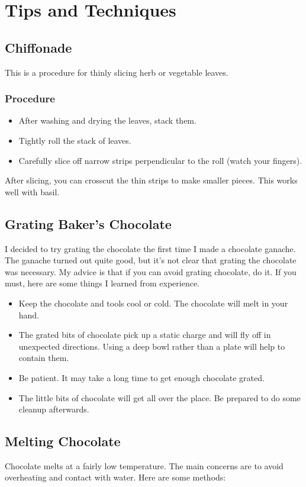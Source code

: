 \documentclass[10pt, openany]{book}
\begin{document}
\chapter{Tips and Techniques}

\section{Chiffonade}
\label{tip:Chiffonade}
This is a procedure for thinly slicing herb or vegetable leaves.
\subsection{Procedure}
\begin{itemize}
  \item After washing and drying the leaves, stack them.
  \item Tightly roll the stack of leaves.
  \item Carefully slice off narrow strips perpendicular to the roll (watch your fingers).
\end{itemize}
After slicing, you can crosscut the thin strips to make smaller pieces.  This works well with basil.

\section{Grating Baker's Chocolate}
\label{tip:GrateChocolate}
I decided to try grating the chocolate the first time I made a chocolate ganache.  The ganache turned out quite good, but it's not clear that grating the chocolate was necessary.  My advice is that if you can avoid grating chocolate, do it.  If you must, here are some things I learned from experience.
\begin{itemize}
  \item Keep the chocolate and tools cool or cold.  The chocolate will melt in your hand.
  \item The grated bits of chocolate pick up a static charge and will fly off in unexpected directions.  Using a deep bowl rather than a plate will help to contain them.
  \item Be patient.  It may take a long time to get enough chocolate grated.
  \item The little bits of chocolate will get all over the place.  Be prepared to do some cleanup afterwards.
\end{itemize}

\section{Melting Chocolate}
\label{tip:MeltChocolate}
Chocolate melts at a fairly low temperature.  The main concerns are to avoid overheating and contact with water.  Here are some methods:
\end{document}
